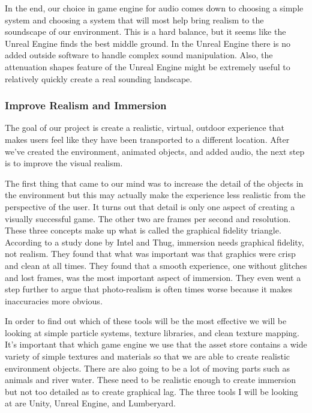 \documentclass[10pt,journal,compsoc,onecolumn, draftclsnofoot]{IEEEtran}
\begin{document}
In the end, our choice in game engine for audio comes down to choosing a simple system and choosing a system that will most help bring realism to the soundscape of our environment.  This is a hard balance, but it seems like the Unreal Engine finds the best middle ground.  In the Unreal Engine there is no added outside software to handle complex sound manipulation.  Also, the attenuation shapes feature of the Unreal Engine might be extremely useful to relatively quickly create a real sounding landscape.

\subsubsection{Improve Realism and Immersion}
The goal of our project is create a realistic, virtual, outdoor experience that makes users feel like they have been transported to a different location.
After we’ve created the environment, animated objects, and added audio, the next step is to improve the visual realism.

The first thing that came to our mind was to increase the detail of the objects in the environment but this may actually make the experience less realistic from the perspective of the user.
It turns out that detail is only one aspect of creating a visually successful game.
The other two are frames per second and resolution.
These three concepts make up what is called the graphical fidelity triangle\cite{wilde_2014}.
According to a study done by Intel and Thug\cite{michalak_lind_round1}, immersion needs graphical fidelity, not realism.
They found that what was important was that graphics were crisp and clean at all times.
They found that a smooth experience, one without glitches and lost frames, was the most important aspect of immersion.
They even went a step further to argue that photo-realism is often times worse because it makes inaccuracies more obvious.

In order to find out which of these tools will be the most effective we will be looking at simple particle systems, texture libraries, and clean texture mapping.
It’s important that which game engine we use that the asset store contains a wide variety of simple textures and materials so that we are able to create realistic environment objects.
There are also going to be a lot of moving parts such as animals and river water.
These need to be realistic enough to create immersion but not too detailed as to create graphical lag.
The three tools I will be looking at are Unity, Unreal Engine, and Lumberyard.
\end{document}
